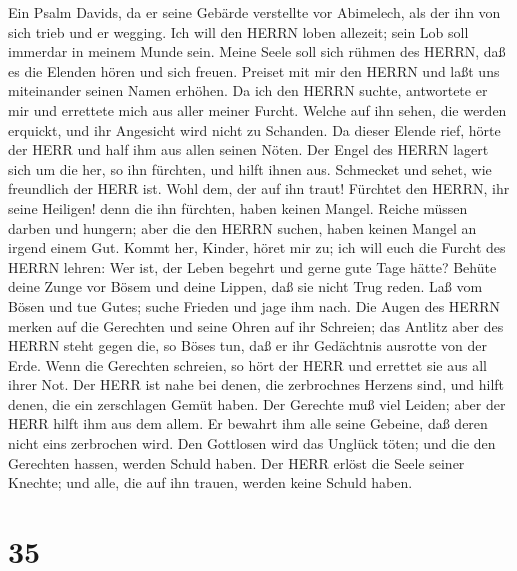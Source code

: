 Ein Psalm Davids, da er seine Gebärde verstellte vor
Abimelech, als der ihn von sich trieb und er wegging. Ich will den HERRN
loben allezeit; sein Lob soll immerdar in meinem Munde sein.
 Meine Seele soll sich rühmen des HERRN, daß es die Elenden
hören und sich freuen.  Preiset mit mir den HERRN und laßt
uns miteinander seinen Namen erhöhen.  Da ich den HERRN
suchte, antwortete er mir und errettete mich aus aller meiner Furcht.
 Welche auf ihn sehen, die werden erquickt, und ihr
Angesicht wird nicht zu Schanden.  Da dieser Elende rief,
hörte der HERR und half ihm aus allen seinen Nöten.  Der
Engel des HERRN lagert sich um die her, so ihn fürchten, und hilft ihnen
aus.  Schmecket und sehet, wie freundlich der HERR ist. Wohl
dem, der auf ihn traut!  Fürchtet den HERRN, ihr seine
Heiligen! denn die ihn fürchten, haben keinen Mangel. 
Reiche müssen darben und hungern; aber die den HERRN suchen, haben
keinen Mangel an irgend einem Gut.  Kommt her, Kinder,
höret mir zu; ich will euch die Furcht des HERRN lehren: 
Wer ist, der Leben begehrt und gerne gute Tage hätte? 
Behüte deine Zunge vor Bösem und deine Lippen, daß sie nicht Trug reden.
 Laß vom Bösen und tue Gutes; suche Frieden und jage ihm
nach.  Die Augen des HERRN merken auf die Gerechten und
seine Ohren auf ihr Schreien;  das Antlitz aber des HERRN
steht gegen die, so Böses tun, daß er ihr Gedächtnis ausrotte von der
Erde.  Wenn die Gerechten schreien, so hört der HERR und
errettet sie aus all ihrer Not.  Der HERR ist nahe bei
denen, die zerbrochnes Herzens sind, und hilft denen, die ein
zerschlagen Gemüt haben.  Der Gerechte muß viel Leiden;
aber der HERR hilft ihm aus dem allem.  Er bewahrt ihm alle
seine Gebeine, daß deren nicht eins zerbrochen wird.  Den
Gottlosen wird das Unglück töten; und die den Gerechten hassen, werden
Schuld haben.  Der HERR erlöst die Seele seiner Knechte;
und alle, die auf ihn trauen, werden keine Schuld haben.

\hypertarget{section-34}{%
\section{35}\label{section-34}}

